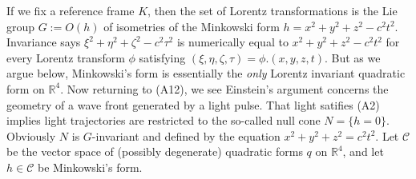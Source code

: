 \documentclass[12pt]{amsart}
\theoremstyle{definition}
\theoremstyle{remark}
\newcommand{\bR}{\mathbb{R}}
\newcommand{\sC}{\mathscr{C}}
\begin{document}
If we fix a reference frame $K$, then the set of Lorentz transformations is the Lie group $G:=O(h)$ of isometries of the Minkowski form $h=x^2+y^2+z^2-c^2t^2$. Invariance says $\xi^2+\eta^2+\zeta^2-c^2 \tau^2$ is numerically equal to $x^2+y^2+z^2-c^2 t^2$ for every Lorentz transform $\phi$ satisfying $(\xi, \eta, \zeta, \tau)=\phi.(x,y,z,t)$. But as we argue below, Minkowski's form is essentially the \emph{only} Lorentz invariant quadratic form on $\bR^4$. Now returning to (A12), we see Einstein's argument concerns the geometry of a wave front generated by a light pulse. That light satifies (A2) implies light trajectories are restricted to the so-called null cone $N=\{h=0\}$. Obviously $N$ is $G$-invariant and defined by the equation $x^2+y^2+z^2=c^2 t^2$. Let $\sC$ be the vector space of (possibly degenerate) quadratic forms $q$ on $\bR^4$, and let $h\in \sC$ be Minkowski's form. 










\end{document}
